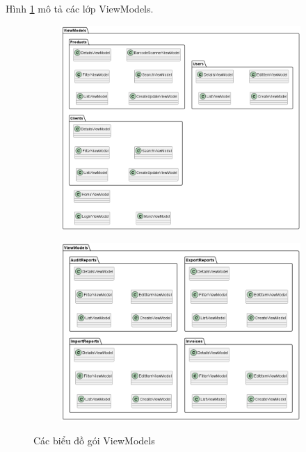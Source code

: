 \documentclass[../DoAn.tex]{subfiles}
\begin{document}
Hình \ref{fig:systemdesign-package-client-viewmodels} mô tả các lớp ViewModels.
\begin{figure}[H]
    \begin{subfigure}{\textwidth}
        \centering
        \includegraphics[width=1\linewidth]{Hinhve/design/package/client/ViewModels1}
    \end{subfigure}

    \begin{subfigure}{\textwidth}
        \centering
        \includegraphics[width=0.9\linewidth]{Hinhve/design/package/client/ViewModels2}
    \end{subfigure}
    \caption{Các biểu đồ gói ViewModels}
    \label{fig:systemdesign-package-client-viewmodels}
\end{figure}
\vfill
\break
\end{document}
